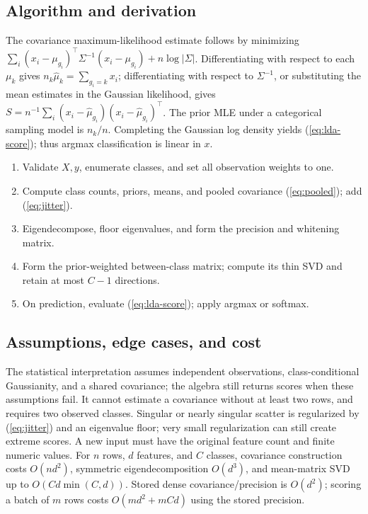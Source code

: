 \documentclass[conference]{IEEEtran}
\begin{document}
\subsection{Algorithm and derivation}
The covariance maximum-likelihood estimate follows by minimizing \(\sum_i(x_i-\mu_{g_i})^\top\Sigma^{-1}(x_i-\mu_{g_i})+n\log|\Sigma|\). Differentiating with respect to each \(\mu_k\) gives \(n_k\hat\mu_k=\sum_{g_i=k}x_i\); differentiating with respect to \(\Sigma^{-1}\), or substituting the mean estimates in the Gaussian likelihood, gives \(S=n^{-1}\sum_i(x_i-\hat\mu_{g_i})(x_i-\hat\mu_{g_i})^\top\). The prior MLE under a categorical sampling model is \(n_k/n\). Completing the Gaussian log density yields (\ref{eq:lda-score}); thus argmax classification is linear in \(x\).
\begin{enumerate}
\item Validate \(X,y\), enumerate classes, and set all observation weights to one.
\item Compute class counts, priors, means, and pooled covariance (\ref{eq:pooled}); add (\ref{eq:jitter}).
\item Eigendecompose, floor eigenvalues, and form the precision and whitening matrix.
\item Form the prior-weighted between-class matrix; compute its thin SVD and retain at most \(C-1\) directions.
\item On prediction, evaluate (\ref{eq:lda-score}); apply argmax or softmax.
\end{enumerate}

\subsection{Assumptions, edge cases, and cost}
The statistical interpretation assumes independent observations, class-conditional Gaussianity, and a shared covariance; the algebra still returns scores when these assumptions fail. It cannot estimate a covariance without at least two rows, and requires two observed classes. Singular or nearly singular scatter is regularized by (\ref{eq:jitter}) and an eigenvalue floor; very small regularization can still create extreme scores. A new input must have the original feature count and finite numeric values. For \(n\) rows, \(d\) features, and \(C\) classes, covariance construction costs \(O(nd^2)\), symmetric eigendecomposition \(O(d^3)\), and mean-matrix SVD up to \(O(Cd\min(C,d))\). Stored dense covariance/precision is \(O(d^2)\); scoring a batch of \(m\) rows costs \(O(md^2+mCd)\) using the stored precision.
\end{document}
